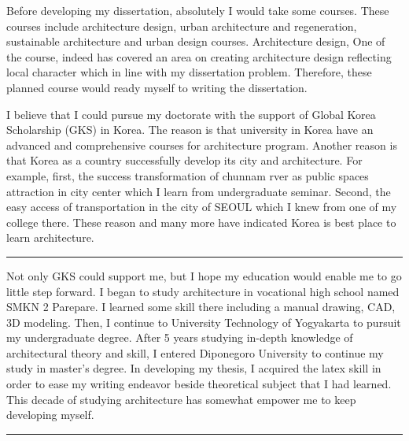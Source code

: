 \documentclass[11pt]{simart} %
\begin{document}
Before developing my dissertation, absolutely I would take some courses. These courses include architecture design, urban architecture and regeneration, sustainable architecture and urban design courses.
Architecture design, One of the course, indeed has covered an area on creating architecture design reflecting local character which in line with my dissertation problem. Therefore, these planned course would ready myself to writing the dissertation.

I believe that I could pursue my doctorate with the support of Global Korea Scholarship (GKS) in Korea. The reason is that university in Korea have an advanced and comprehensive courses for architecture program. Another reason is that Korea as a country successfully develop its city and architecture.
For example, first, the success  transformation of chunnam rver as public spaces attraction in city center which I learn from  undergraduate seminar.
Second, the easy access of transportation in the city of SEOUL which I knew from one of my college there. These reason and many more have indicated Korea is best place to learn architecture.

\noindent\rule{\linewidth}{0.5pt}

Not only GKS could support me, but I hope my education would enable me to go little step forward. I began to study architecture in vocational high school named SMKN 2 Parepare. I learned some skill there including a manual drawing, CAD, 3D modeling. Then, I continue to University Technology of Yogyakarta to pursuit my undergraduate degree. After 5 years studying in-depth knowledge of architectural theory and skill, I entered Diponegoro University to continue my study in master's degree. In developing my thesis, I acquired the latex skill in order to ease my writing endeavor beside theoretical subject that I had learned.
This decade of studying architecture has somewhat empower me to keep developing myself.


\noindent\rule{\linewidth}{0.5pt}
\end{document}
